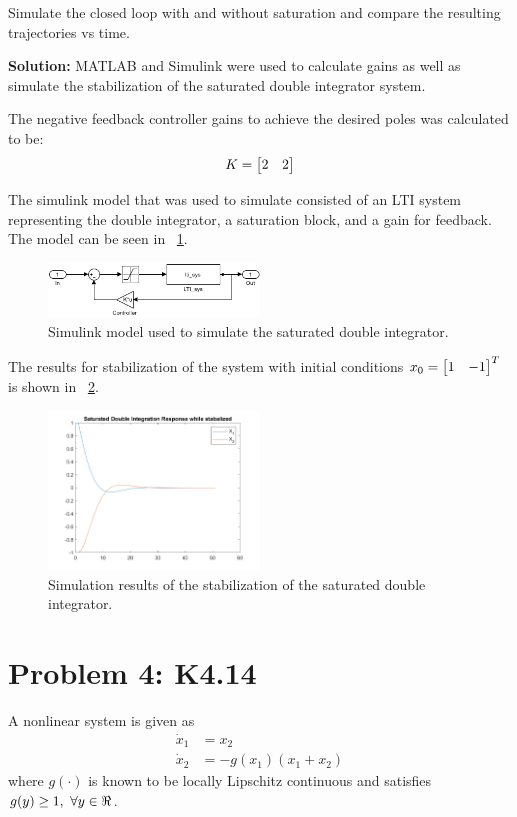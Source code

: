\documentclass[letter]{article}
\begin{document}
Simulate the closed loop with and without saturation and compare the resulting trajectories vs time.

\noindent
\textbf{Solution:}
MATLAB and Simulink were used to calculate gains as well as simulate the stabilization of the saturated double integrator system.

The negative feedback controller gains to achieve the desired poles was calculated to be:
\begin{equation}
	K = \mqty[2 & 2]
\end{equation}

The simulink model that was used to simulate consisted of an LTI system representing the double integrator, a saturation block, and a gain for feedback. The model can be seen in \figurename \ \ref{fig:pblm3_c_model}. 
\begin{figure}[h]
	\centering
	\label{fig:pblm3_c_model}
	\includegraphics[width=0.5\textwidth]{fig/pblm3_c_model}
	\caption{Simulink model used to simulate the saturated double integrator.}
\end{figure}

The results for stabilization of the system with initial conditions $x_0 = \mqty[1 &-1]^T$ is shown in \figurename \ \ref{fig:pblm3_c_plot}.
\begin{figure}[h]
	\centering
	\label{fig:pblm3_c_plot}
	\includegraphics[width=0.5\textwidth]{fig/pblm3_c_plot}
	\caption{Simulation results of the stabilization of the saturated double integrator.}
\end{figure}









\newpage
\section{Problem 4: K4.14}
A nonlinear system is given as
\begin{equation}\label{eq:pblm4_sys}
	\begin{aligned}
		\dot{x}_1 &= x_2\\
		\dot{x}_2 &= -g(x_1) (x_1 + x_2)
	\end{aligned}
\end{equation}
where $g(\cdot)$ is known to be locally Lipschitz continuous and satisfies $g(y) \geq 1, \ \forall y \in \real$.
\end{document}
